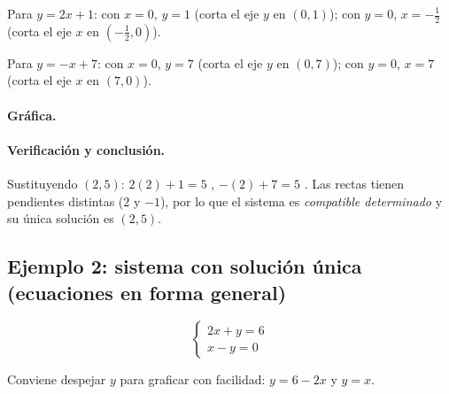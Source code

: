 \documentclass[12pt]{article}
\begin{document}
Para \(y=2x+1\): con \(x=0\), \(y=1\) (corta el eje \(y\) en \((0,1)\)); con \(y=0\), \(x=-\tfrac{1}{2}\) (corta el eje \(x\) en \(\left(-\tfrac{1}{2},0\right)\)).

Para \(y=-x+7\): con \(x=0\), \(y=7\) (corta el eje \(y\) en \((0,7)\)); con \(y=0\), \(x=7\) (corta el eje \(x\) en \((7,0)\)).

\paragraph{Gráfica.}

\begin{center}
\end{center}

\paragraph{Verificación y conclusión.} Sustituyendo \((2,5)\): \(2(2)+1=5\) \checkmark, \(-(2)+7=5\) \checkmark. Las rectas tienen pendientes distintas (\(2\) y \(-1\)), por lo que el sistema es \emph{compatible determinado} y su única solución es \((2,5)\).

\subsection{Ejemplo 2: sistema con solución única (ecuaciones en forma general)}

\[
\begin{cases}
2x + y = 6 \\
x - y = 0
\end{cases}
\]

Conviene despejar \(y\) para graficar con facilidad: \(y=6-2x\) y \(y=x\).
\end{document}

